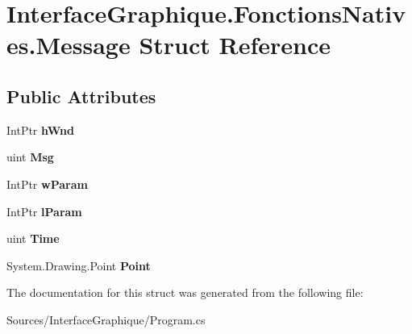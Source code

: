 \hypertarget{struct_interface_graphique_1_1_fonctions_natives_1_1_message}{}\section{Interface\+Graphique.\+Fonctions\+Natives.\+Message Struct Reference}
\label{struct_interface_graphique_1_1_fonctions_natives_1_1_message}
\subsection*{Public Attributes}
\begin{DoxyCompactItemize}
\item 
\hypertarget{struct_interface_graphique_1_1_fonctions_natives_1_1_message_aa25d996ad709246eecada71a0f375b21}{}Int\+Ptr {\bfseries h\+Wnd}\label{struct_interface_graphique_1_1_fonctions_natives_1_1_message_aa25d996ad709246eecada71a0f375b21}

\item 
\hypertarget{struct_interface_graphique_1_1_fonctions_natives_1_1_message_a1b1dfd72e58f292bbd24d6dc7a0b0f61}{}uint {\bfseries Msg}\label{struct_interface_graphique_1_1_fonctions_natives_1_1_message_a1b1dfd72e58f292bbd24d6dc7a0b0f61}

\item 
\hypertarget{struct_interface_graphique_1_1_fonctions_natives_1_1_message_aa04705defc08a7fea09f90b1cd069e20}{}Int\+Ptr {\bfseries w\+Param}\label{struct_interface_graphique_1_1_fonctions_natives_1_1_message_aa04705defc08a7fea09f90b1cd069e20}

\item 
\hypertarget{struct_interface_graphique_1_1_fonctions_natives_1_1_message_afc019b6c13559ba2a12a64e24eba9baf}{}Int\+Ptr {\bfseries l\+Param}\label{struct_interface_graphique_1_1_fonctions_natives_1_1_message_afc019b6c13559ba2a12a64e24eba9baf}

\item 
\hypertarget{struct_interface_graphique_1_1_fonctions_natives_1_1_message_ae0ab10151482b01c9c5fe1cb4e8a2306}{}uint {\bfseries Time}\label{struct_interface_graphique_1_1_fonctions_natives_1_1_message_ae0ab10151482b01c9c5fe1cb4e8a2306}

\item 
\hypertarget{struct_interface_graphique_1_1_fonctions_natives_1_1_message_a9dc93f6c7f6db4f91386aef27b0a77ad}{}System.\+Drawing.\+Point {\bfseries Point}\label{struct_interface_graphique_1_1_fonctions_natives_1_1_message_a9dc93f6c7f6db4f91386aef27b0a77ad}

\end{DoxyCompactItemize}


The documentation for this struct was generated from the following file\+:\begin{DoxyCompactItemize}
\item 
Sources/\+Interface\+Graphique/Program.\+cs\end{DoxyCompactItemize}
